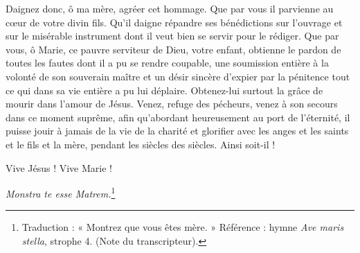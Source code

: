 \newpage
Daignez donc, ô ma mère, agréer cet hommage. Que par vous il parvienne au cœur de votre divin fils. Qu'il daigne répandre ses bénédictions sur l'ouvrage et sur le misérable instrument dont il veut bien se servir pour le rédiger. Que par vous, ô Marie, ce pauvre serviteur de Dieu, votre enfant, obtienne le pardon de toutes les fautes dont il a pu se rendre coupable, une soumission entière à la volonté de son souverain maître et un désir sincère d'expier par la pénitence tout ce qui dans sa vie entière a pu lui déplaire. Obtenez-lui surtout la grâce de mourir dans l'amour de Jésus. Venez, refuge des pécheurs, venez à son secours dans ce moment suprême, afin qu'abordant heureusement au port de l'éternité, il puisse jouir à jamais de la vie de la charité et glorifier avec les anges et les saints et le fils et la mère, pendant
les siècles des siècles. Ainsi soit-il !

\begin{center}
Vive Jésus ! Vive Marie !\par
\textit{Monstra te esse Matrem.}\footnote{Traduction : « Montrez que vous êtes mère. » Référence : hymne \textit{Ave maris stella}, strophe 4. (Note du transcripteur).}
\end{center}
